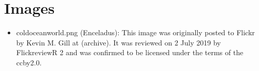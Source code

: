 \documentclass[letterpaper,10pt,english]{sphinxmanual}
\begin{document}
\section{Images}
\label{\detokenize{attributions/attributions:images}}\label{\detokenize{attributions/attributions:id1}}\begin{itemize}
\item {} 
\sphinxAtStartPar
cold\sphinxhyphen{}ocean\sphinxhyphen{}world.png (Enceladus): This image was originally posted to Flickr by Kevin M. Gill at  (archive). It was reviewed on 2 July 2019 by FlickreviewR 2 and was confirmed to be licensed under the terms of the cc\sphinxhyphen{}by\sphinxhyphen{}2.0.

\end{itemize}



\renewcommand{\indexname}{Index}
\printindex
\end{document}
